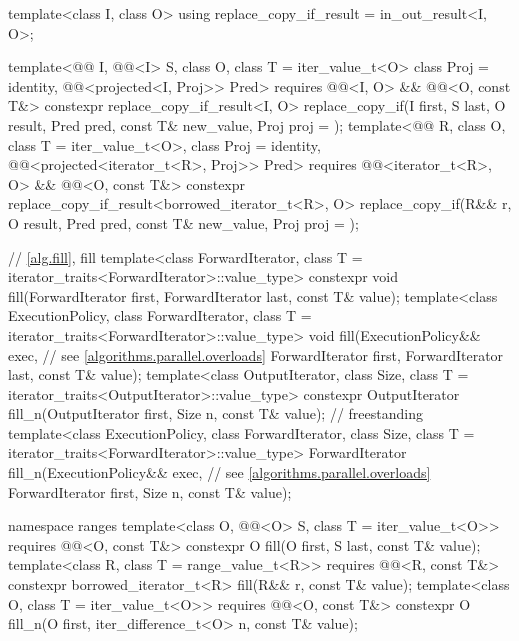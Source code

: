 \begin{codeblock}
{{    template<class I, class O>
      using replace_copy_if_result = in_out_result<I, O>;

    template<@@ I, @@<I> S, class O, class T = iter_value_t<O>
             class Proj = identity, @@<projected<I, Proj>> Pred>
      requires @@<I, O> && @@<O, const T&>
      constexpr replace_copy_if_result<I, O>
        replace_copy_if(I first, S last, O result, Pred pred, const T& new_value,
                        Proj proj = {});
    template<@@ R, class O, class T = iter_value_t<O>, class Proj = identity,
             @@<projected<iterator_t<R>, Proj>> Pred>
      requires @@<iterator_t<R>, O> && @@<O, const T&>
      constexpr replace_copy_if_result<borrowed_iterator_t<R>, O>
        replace_copy_if(R&& r, O result, Pred pred, const T& new_value,
                        Proj proj = {});
  }

  // \ref{alg.fill}, fill
  template<class ForwardIterator, class T = iterator_traits<ForwardIterator>::value_type>
    constexpr void fill(ForwardIterator first, ForwardIterator last, const T& value);
  template<class ExecutionPolicy, class ForwardIterator,
           class T = iterator_traits<ForwardIterator>::value_type>
    void fill(ExecutionPolicy&& exec,                           // see \ref{algorithms.parallel.overloads}
              ForwardIterator first, ForwardIterator last, const T& value);
  template<class OutputIterator, class Size,
           class T = iterator_traits<OutputIterator>::value_type>
    constexpr OutputIterator fill_n(OutputIterator first, Size n, const T& value);  // freestanding
  template<class ExecutionPolicy, class ForwardIterator,
           class Size, class T = iterator_traits<ForwardIterator>::value_type>
    ForwardIterator fill_n(ExecutionPolicy&& exec,              // see \ref{algorithms.parallel.overloads}
                           ForwardIterator first, Size n, const T& value);

  namespace ranges {
    template<class O, @@<O> S, class T = iter_value_t<O>>
      requires @@<O, const T&>
      constexpr O fill(O first, S last, const T& value);
    template<class R, class T = range_value_t<R>>
      requires @@<R, const T&>
      constexpr borrowed_iterator_t<R> fill(R&& r, const T& value);
    template<class O, class T = iter_value_t<O>>
      requires @@<O, const T&>
      constexpr O fill_n(O first, iter_difference_t<O> n, const T& value);
  }

}
\end{codeblock}
